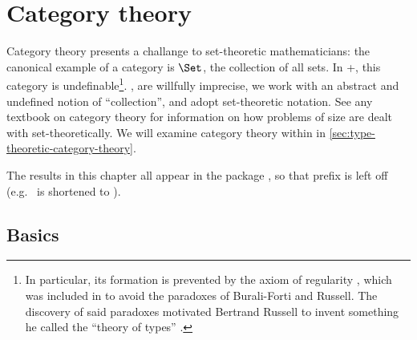 \documentclass[./thesis.tex]{subfiles}
\begin{document}
\chapter{Category theory}
\label{chap:category-theory}

Category theory presents a challange to set-theoretic mathematicians: the
canonical example of a category is $\Set$, the collection of all sets. In
\ZFC+\FOL{}, this category is undefinable\footnote{In
  particular, its formation is prevented by the axiom of regularity
  \cite{vonneumann}, which was included in \ZFC{} to avoid the
  paradoxes of Burali-Forti and Russell. The discovery of said paradoxes
  motivated Bertrand Russell to invent something he called the ``theory of
  types'' \cite{russell}.}.
,
are willfully imprecise, we work with an abstract and undefined notion of
``collection'', and adopt set-theoretic notation. See any textbook on category
theory for information on how problems of size are dealt with set-theoretically.
We will examine category theory within \UTT{} in
\cref{sec:type-theoretic-category-theory}.

The results in this chapter all appear in the \UniMath{} package
, so that prefix is left off
(e.g.\  is shortened to
).

\section{Basics}
\label{sec:basics}
\end{document}
